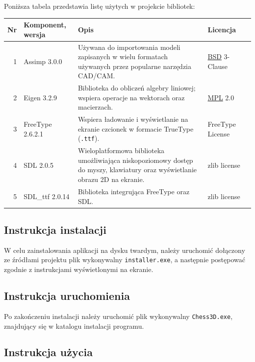 \documentclass[10pt,a4paper]{article}
\begin{document}
Poniższa tabela przedstawia listę użytych w projekcie bibliotek:

\begin{table}[H]
	\begin{tabularx}{\textwidth}{|r|l|X|l|c|}
		\hline
		\textbf{Nr} & \textbf{Komponent, wersja} & \textbf{Opis} & \textbf{Licencja} & \\
		\hline
		1 &
		Assimp 3.0.0 &
		Używana do importowania modeli zapisanych w wielu formatach używanych przez popularne narzędzia CAD/CAM. &
		\mbox{\hyperref[abbr:bsd]{BSD}} 3-Clause &
		\cite{assimp} \\
		\hline
		2 &
		Eigen 3.2.9 &
		Biblioteka do obliczeń algebry liniowej; wspiera operacje na wektorach oraz macierzach. &
		\mbox{\hyperref[abbr:mpl]{MPL}} 2.0 &
		\cite{eigen} \\
		\hline
		3 &
		FreeType 2.6.2.1 &
		Wspiera ładowanie i wyświetlanie na ekranie czcionek w formacie TrueType (\texttt{.ttf}). &
		FreeType License &
		\cite{freetype} \\
		\hline
		4 &
		SDL 2.0.5 &
		Wieloplatformowa biblioteka umożliwiająca niskopoziomowy dostęp do myszy, klawiatury oraz wyświetlanie obrazu 2D na ekranie. &
		zlib license &
		\cite{sdl} \\
		\hline
		5 &
		SDL\_ttf 2.0.14 &
		Biblioteka integrująca FreeType oraz SDL. &
		zlib license &
		\cite{sdl_ttf} \\
		\hline
	\end{tabularx}
\end{table}

\subsection{Instrukcja instalacji}

W celu zainstalowania aplikacji na dysku twardym, należy uruchomić dołączony ze źródłami projektu plik wykonywalny \texttt{installer.exe}, a następnie postępować zgodnie z instrukcjami wyświetlonymi na ekranie.

\subsection{Instrukcja uruchomienia}

Po zakończeniu instalacji należy uruchomić plik wykonywalny \texttt{Chess3D.exe}, znajdujący się w katalogu instalacji programu.

\subsection{Instrukcja użycia}
\end{document}
